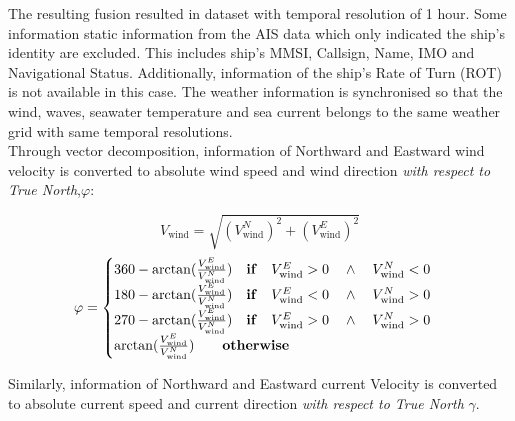 The resulting fusion resulted in dataset with temporal resolution of 1 hour. Some information static information from the AIS data which only indicated the ship's identity are excluded. This includes ship's MMSI, Callsign, Name, IMO and Navigational Status. Additionally, information of the ship's Rate of Turn (ROT) is not available in this case. The weather information is synchronised so that the wind, waves, seawater temperature and sea current belongs to the same weather grid with same temporal resolutions.\\ 

Through vector decomposition, information of Northward and Eastward wind velocity is converted to absolute wind speed and wind direction \emph{with respect to True North},$\varphi$:

\begin{equation}\label{eqn:vwindabs}
    V_{\text{wind}} = \sqrt{(V_{\text{wind}}^N)^2 + (V_{\text{wind}}^E)^2} 
\end{equation}
\begin{equation}\label{eqn:winddir}
    \varphi = 
    \begin{cases}
        360 - \arctan(\frac{V_{\text{wind}}^E}{V_{\text{wind}}^N}) \quad \text{\textbf{if}} \quad V_{\text{wind}}^E > 0 \quad \wedge \quad V_{\text{wind}}^N < 0 \\ 
        180 - \arctan(\frac{V_{\text{wind}}^E}{V_{\text{wind}}^N}) \quad \text{\textbf{if}} \quad V_{\text{wind}}^E < 0 \quad \wedge \quad V_{\text{wind}}^N > 0 \\ 
        270 - \arctan(\frac{V_{\text{wind}}^E}{V_{\text{wind}}^N}) \quad \text{\textbf{if}} \quad V_{\text{wind}}^E > 0 \quad \wedge \quad V_{\text{wind}}^N > 0 \\
        \arctan(\frac{V_{\text{wind}}^E}{V_{\text{wind}}^N}) \qquad \text{\textbf{otherwise}} 
    \end{cases}   
\end{equation}

Similarly, information of Northward and Eastward current Velocity is converted to absolute current speed and current direction \emph{with respect to True North} $\gamma$.\\ 

